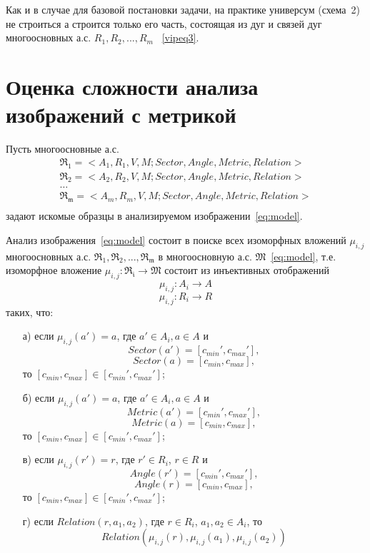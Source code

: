 \begin{remark}
Как и в случае для базовой постановки задачи, на практике универсум (схема~2) не строиться а строится только его часть, состоящая из дуг и связей дуг многоосновных а.с.  $R_1,R_2 , ..., R_m$ ~\ref{vipeq3}.
\end{remark}



\section{Оценка сложности анализа изображений с метрикой}

Пусть многоосновные а.с.
\begin{equation}
	\begin{array}{c}
	\mathfrak{R_1}=<A_1, R_1, V, M; Sector, Angle, Metric, Relation> \\
	\mathfrak{R_2}=<A_2, R_2, V, M; Sector, Angle, Metric, Relation> \\
	\dots\\
	\mathfrak{R_m}=<A_m, R_m, V, M; Sector, Angle, Metric, Relation> \\
	\end{array}
\end{equation}
задают искомые образцы в анализируемом изображении~\ref{eq:model}.

Анализ изображения~\ref{eq:model} состоит в поиске всех изоморфных вложений ${ \mu_{i,j} }$ многоосновных а.с. $\mathfrak{R_1,R_2,...,R_m}$ в многоосновную а.с. $\mathfrak{M}$~\ref{eq:model}, т.е. изоморфное вложение $\mu_{i,j} : \mathfrak{R_i} \rightarrow \mathfrak{M}$ состоит из инъективных отображений
$$\mu_{i,j} : A_i \rightarrow A$$
$$\mu_{i,j} : R_i \rightarrow R$$
таких, что:
\begin{enumerate}
\item[а)] если $\mu_{i,j}(a') = a$, где $a' \in A_i, a \in A$ и 
$$Sector(a') = [c_{min}', c_{max}'],$$
$$Sector(a) = [c_{min}, c_{max}],$$
то $[c_{min}, c_{max}] \in [c_{min}', c_{max}']$;
\item[б)] если $\mu_{i,j}(a') = a$, где $a' \in A_i, a \in A$ и 
$$Metric(a') = [c_{min}', c_{max}'],$$
$$Metric(a) = [c_{min}, c_{max}],$$
то $[c_{min}, c_{max}] \in [c_{min}', c_{max}']$;
\item[в)] если $\mu_{i,j}(r') = r$, где $r' \in R_i$, $r \in R$ и 
$$Angle(r') =  [c_{min}', c_{max}'],$$
$$Angle(r) = [c_{min}, c_{max}],$$
то $[c_{min}, c_{max}] \in [c_{min}', c_{max}']$;
\item[г)] если $Relation(r, a_1, a_2)$, где $r \in R_i$, $a_1, a_2 \in A_i$, то 
$$Relation(\mu_{i,j}(r), \mu_{i,j}(a_1), \mu_{i,j}(a_2))$$
\end{enumerate}

